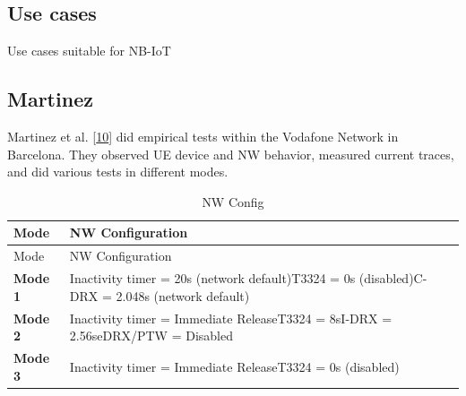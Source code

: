 \documentclass[]{article}
\begin{document}
\hypertarget{use-cases}{%
\subsection{Use cases}\label{use-cases}}

Use cases suitable for NB-IoT

\hypertarget{martinez}{%
\subsection{Martinez}\label{martinez}}

Martinez et al. {[}\protect\hyperlink{ref-Martinez2019}{10}{]} did
empirical tests within the Vodafone Network in Barcelona. They observed
UE device and NW behavior, measured current traces, and did various
tests in different modes.

\begin{longtable}[]{@{}ll@{}}
\caption{NW Config \label{tbl:nw_config}}\tabularnewline
\toprule
\begin{minipage}[b]{0.13\columnwidth}\raggedright
Mode\strut
\end{minipage} & \begin{minipage}[b]{0.81\columnwidth}\raggedright
NW Configuration\strut
\end{minipage}\tabularnewline
\midrule
\endfirsthead
\toprule
\begin{minipage}[b]{0.13\columnwidth}\raggedright
Mode\strut
\end{minipage} & \begin{minipage}[b]{0.81\columnwidth}\raggedright
NW Configuration\strut
\end{minipage}\tabularnewline
\midrule
\endhead
\begin{minipage}[t]{0.13\columnwidth}\raggedright
\textbf{Mode 1}\strut
\end{minipage} & \begin{minipage}[t]{0.81\columnwidth}\raggedright
Inactivity timer = 20s (network default)T3324 = 0s (disabled)C-DRX =
2.048s (network default)\strut
\end{minipage}\tabularnewline
\begin{minipage}[t]{0.13\columnwidth}\raggedright
\textbf{Mode 2}\strut
\end{minipage} & \begin{minipage}[t]{0.81\columnwidth}\raggedright
Inactivity timer = Immediate ReleaseT3324 = 8sI-DRX = 2.56seDRX/PTW =
Disabled\strut
\end{minipage}\tabularnewline
\begin{minipage}[t]{0.13\columnwidth}\raggedright
\textbf{Mode 3}\strut
\end{minipage} & \begin{minipage}[t]{0.81\columnwidth}\raggedright
Inactivity timer = Immediate ReleaseT3324 = 0s (disabled)\strut
\end{minipage}\tabularnewline
\bottomrule
\end{longtable}
\end{document}
